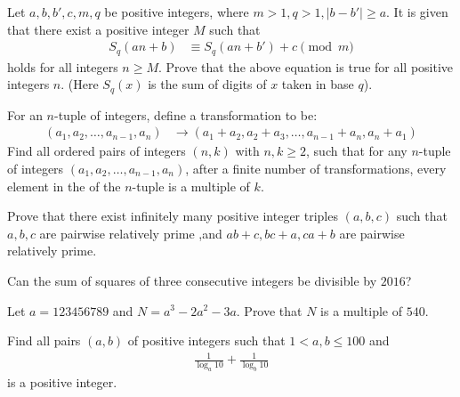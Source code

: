 \documentclass[problems.tex]{subfile}
\begin{document}
	\begin{problem}
		Let $a,b,b',c,m,q$ be positive integers, where $m>1,q>1,|b-b'|\ge a$. It is given that there exist a positive integer $M$ such that
			\begin{align*}
				S_q(an+b)
					& \equiv S_q(an+b')+c\pmod{m}
			\end{align*}
		holds for all integers $n\ge M$. Prove that the above equation is true for all positive integers $n$. (Here $S_q(x)$ is the sum of digits of $x$ taken in base $q$). %
	\end{problem}

	\begin{problem}
		For an $n$-tuple of integers, define a transformation to be:
			\begin{align*}
				(a_1,a_2,\dots,a_{n-1},a_n)
					& \rightarrow (a_1+a_2, a_2+a_3, \dots, a_{n-1}+a_n, a_n+a_1)
			\end{align*}
		Find all ordered pairs of integers $(n,k)$ with $n,k\geq 2$, such that for any $n$-tuple of integers $(a_1,a_2,\dots,a_{n-1},a_n)$, after a finite number of transformations, every element in the of the $n$-tuple is a multiple of $k$. %
	\end{problem}

	\begin{problem}
		Prove that there exist infinitely many positive integer triples $(a,b,c)$ such that $a ,b,c$ are pairwise relatively prime ,and $ab+c ,bc+a ,ca+b$ are pairwise relatively prime. %
	\end{problem}

	\begin{problem}
		Can the sum of squares of three consecutive integers be divisible by $2016$?
	\end{problem}

	\begin{problem}
		Let $a = 123456789$ and $N = a^3 - 2a^2 - 3a$. Prove that $N$ is a multiple of $540$.
	\end{problem}

	\begin{problem}
		Find all pairs $(a, b)$ of positive integers such that $1 < a, b \leq 100$ and
		\begin{align*}
			\frac{1}{\log_a 10} + \frac{1}{\log_b 10}
		\end{align*}
		is a positive integer.
	\end{problem}
\end{document}
